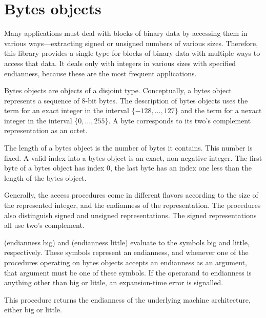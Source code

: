\section{Bytes objects}
\label{bytesobjects}

Many applications must deal with blocks of binary data by accessing
them in various ways---extracting signed or unsigned numbers of
various sizes.  Therefore, this library provides a single type for
blocks of binary data with multiple ways to access that data. It deals
only with integers in various sizes with specified endianness, because
these are the most frequent applications.

Bytes objects are objects of a disjoint
type. Conceptually, a bytes object represents a sequence of 8-bit
bytes.  The description of bytes objects uses the term 
for an exact integer in the interval $\{-128, \ldots, 127\}$ and the
term  for a nexact integer in the interval $\{0,
\ldots, 255\}$.  A byte corresponds to its two's complement
representation as an octet.

The length of a bytes object is the number of bytes it contains. This
number is fixed. A valid index into a bytes object is an exact,
non-negative integer. The first byte of a bytes object has index 0,
the last byte has an index one less than the length of the bytes
object.

Generally, the access procedures come in different flavors according
to the size of the represented integer, and the endianness of the
representation.  The procedures also distinguish signed and unsigned representations.
The signed representations all use two's complement.

\begin{entry}{%
}
   
{\cf (endianness big)} and {\cf (endianness little)} evaluate to the
symbols {\cf big} and {\cf little}, respectively. These symbols
represent an endianness, and whenever one of the procedures operating
on bytes objects accepts an endianness as an argument, that argument
must be one of these symbols. If the operarand to endianness is
anything other than big or little, an expansion-time error is
signalled. %
\end{entry}

\begin{entry}{%
}

This procedure returns the endianness of the underlying machine
architecture, either {\cf big} or {\cf little}.
\end{entry}   

